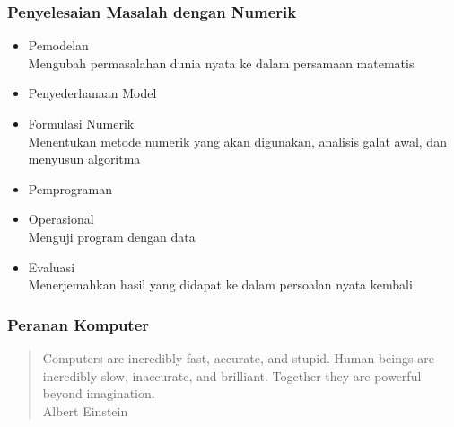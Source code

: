\documentclass{beamer}
\begin{document}
\begin{frame}
\frametitle{Penyelesaian Masalah dengan Numerik}
\begin{itemize}
\item Pemodelan
\\Mengubah permasalahan dunia nyata ke dalam persamaan matematis
\item Penyederhanaan Model
\item Formulasi Numerik
\\Menentukan metode numerik yang akan digunakan, analisis galat awal, dan menyusun algoritma
\item Pemprograman
\item Operasional
\\Menguji program dengan data
\item Evaluasi
\\Menerjemahkan hasil yang didapat ke dalam persoalan nyata kembali
\end{itemize}
\end{frame}


\begin{frame}
\frametitle{Peranan Komputer}
\begin{quote}
Computers are incredibly fast, accurate, and stupid. Human beings are incredibly slow, inaccurate, and brilliant. Together they are powerful beyond imagination. 
\\\qquad \qquad \qquad \qquad \qquad \qquad \qquad \qquad \qquad Albert Einstein
\end{quote}
\end{frame}

\end{document}

